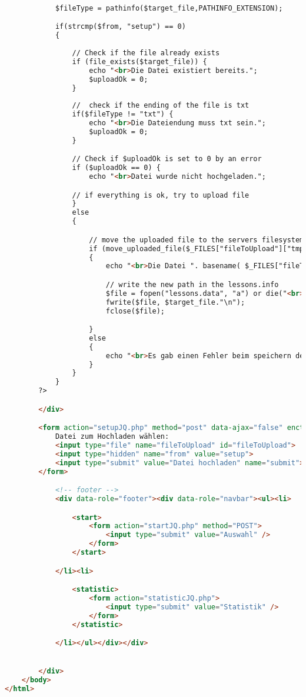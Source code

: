 \documentclass{scrartcl}
\begin{document}
\begin{itemize}
\begin{lstlisting}[language=html]
			
			$fileType = pathinfo($target_file,PATHINFO_EXTENSION);

			if(strcmp($from, "setup") == 0)
			{
			
				// Check if the file already exists
				if (file_exists($target_file)) {
					echo "<br>Die Datei existiert bereits.";
					$uploadOk = 0;
				}
		
				//  check if the ending of the file is txt
				if($fileType != "txt") {
					echo "<br>Die Dateiendung muss txt sein.";
					$uploadOk = 0;
				}

				// Check if $uploadOk is set to 0 by an error
				if ($uploadOk == 0) {
					echo "<br>Datei wurde nicht hochgeladen.";

				// if everything is ok, try to upload file
				} 
				else 
				{

					// move the uploaded file to the servers filesystem
					if (move_uploaded_file($_FILES["fileToUpload"]["tmp_name"], $target_file))
					{
						echo "<br>Die Datei ". basename( $_FILES["fileToUpload"]["name"]). " wurde hochgeladen.";

						// write the new path in the lessons.info
						$file = fopen("lessons.data", "a") or die("<br>Die Lessons-Datei kann nicht geöffnet werden!");		
						fwrite($file, $target_file."\n");
						fclose($file);

					} 
					else 
					{
						echo "<br>Es gab einen Fehler beim speichern der hochgeladenen Datei.";
					}
				}
			}
		?>		

		</div>

		<form action="setupJQ.php" method="post" data-ajax="false" enctype="multipart/form-data">
			Datei zum Hochladen wählen:
			<input type="file" name="fileToUpload" id="fileToUpload">
			<input type="hidden" name="from" value="setup">
			<input type="submit" value="Datei hochladen" name="submit">
		</form>

			<!-- footer -->
			<div data-role="footer"><div data-role="navbar"><ul><li>

				<start>
					<form action="startJQ.php" method="POST">
						<input type="submit" value="Auswahl" />
					</form>
				</start>

			</li><li>

				<statistic>
					<form action="statisticJQ.php">
						<input type="submit" value="Statistik" />
					</form>
				</statistic>

			</li></ul></div></div>


		</div> 
	</body>
</html>
\end{lstlisting}
\end{itemize}
\clearpage
\end{document}
